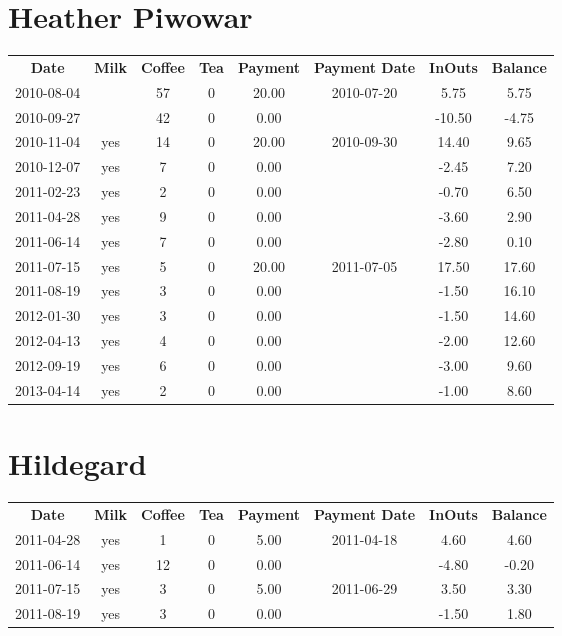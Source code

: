 \section{Heather Piwowar}

\begin{center}
\begin{tabular}{cccccccc}
\textbf{Date} & \textbf{Milk} & \textbf{Coffee} & \textbf{Tea} & \textbf{Payment} & \textbf{Payment Date} & \textbf{InOuts} & \textbf{Balance} \\
2010-08-04 &  & 57 & 0 & 20.00 & 2010-07-20 &   5.75 &  5.75\\ 
2010-09-27 &  & 42 & 0 &  0.00 &  & -10.50 & -4.75\\ 
2010-11-04 & yes & 14 & 0 & 20.00 & 2010-09-30 &  14.40 &  9.65\\ 
2010-12-07 & yes &  7 & 0 &  0.00 &  &  -2.45 &  7.20\\ 
2011-02-23 & yes &  2 & 0 &  0.00 &  &  -0.70 &  6.50\\ 
2011-04-28 & yes &  9 & 0 &  0.00 &  &  -3.60 &  2.90\\ 
2011-06-14 & yes &  7 & 0 &  0.00 &  &  -2.80 &  0.10\\ 
2011-07-15 & yes &  5 & 0 & 20.00 & 2011-07-05 &  17.50 & 17.60\\ 
2011-08-19 & yes &  3 & 0 &  0.00 &  &  -1.50 & 16.10\\ 
2012-01-30 & yes &  3 & 0 &  0.00 &  &  -1.50 & 14.60\\ 
2012-04-13 & yes &  4 & 0 &  0.00 &  &  -2.00 & 12.60\\ 
2012-09-19 & yes &  6 & 0 &  0.00 &  &  -3.00 &  9.60\\ 
2013-04-14 & yes &  2 & 0 &  0.00 &  &  -1.00 &  8.60
\end{tabular}
\end{center}

\section{Hildegard}

\begin{center}
\begin{tabular}{cccccccc}
\textbf{Date} & \textbf{Milk} & \textbf{Coffee} & \textbf{Tea} & \textbf{Payment} & \textbf{Payment Date} & \textbf{InOuts} & \textbf{Balance} \\
2011-04-28 & yes &  1 & 0 & 5.00 & 2011-04-18 &  4.60 &  4.60\\ 
2011-06-14 & yes & 12 & 0 & 0.00 &  & -4.80 & -0.20\\ 
2011-07-15 & yes &  3 & 0 & 5.00 & 2011-06-29 &  3.50 &  3.30\\ 
2011-08-19 & yes &  3 & 0 & 0.00 &  & -1.50 &  1.80
\end{tabular}
\end{center}

